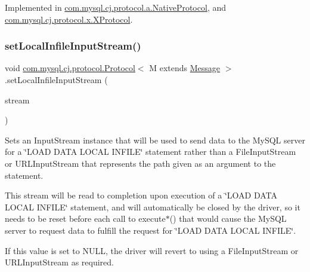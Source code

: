 Implemented in \mbox{\hyperlink{classcom_1_1mysql_1_1cj_1_1protocol_1_1a_1_1_native_protocol_a0b65b9cd6aa03061e067e1d595d0ef39}{com.\+mysql.\+cj.\+protocol.\+a.\+Native\+Protocol}}, and \mbox{\hyperlink{classcom_1_1mysql_1_1cj_1_1protocol_1_1x_1_1_x_protocol_a5d594bb0ea3ed519640a02cbdd74a165}{com.\+mysql.\+cj.\+protocol.\+x.\+X\+Protocol}}.

\mbox{\label{interfacecom_1_1mysql_1_1cj_1_1protocol_1_1_protocol_a995483a591a66d63e273140ef0ac47e7}} 
\subsubsection{\texorpdfstring{set\+Local\+Infile\+Input\+Stream()}{setLocalInfileInputStream()}}
{\footnotesize\ttfamily void \mbox{\hyperlink{interfacecom_1_1mysql_1_1cj_1_1protocol_1_1_protocol}{com.\+mysql.\+cj.\+protocol.\+Protocol}}$<$ M extends \mbox{\hyperlink{interfacecom_1_1mysql_1_1cj_1_1protocol_1_1_message}{Message}} $>$.set\+Local\+Infile\+Input\+Stream (\begin{DoxyParamCaption}\item[{Input\+Stream}]{stream }\end{DoxyParamCaption})}

Sets an Input\+Stream instance that will be used to send data to the My\+S\+QL server for a \char`\"{}\+L\+O\+A\+D D\+A\+T\+A L\+O\+C\+A\+L I\+N\+F\+I\+L\+E\char`\"{} statement rather than a File\+Input\+Stream or U\+R\+L\+Input\+Stream that represents the path given as an argument to the statement.

This stream will be read to completion upon execution of a \char`\"{}\+L\+O\+A\+D D\+A\+T\+A L\+O\+C\+A\+L I\+N\+F\+I\+L\+E\char`\"{} statement, and will automatically be closed by the driver, so it needs to be reset before each call to execute$\ast$() that would cause the My\+S\+QL server to request data to fulfill the request for \char`\"{}\+L\+O\+A\+D D\+A\+T\+A L\+O\+C\+A\+L I\+N\+F\+I\+L\+E\char`\"{}.

If this value is set to N\+U\+LL, the driver will revert to using a File\+Input\+Stream or U\+R\+L\+Input\+Stream as required.


